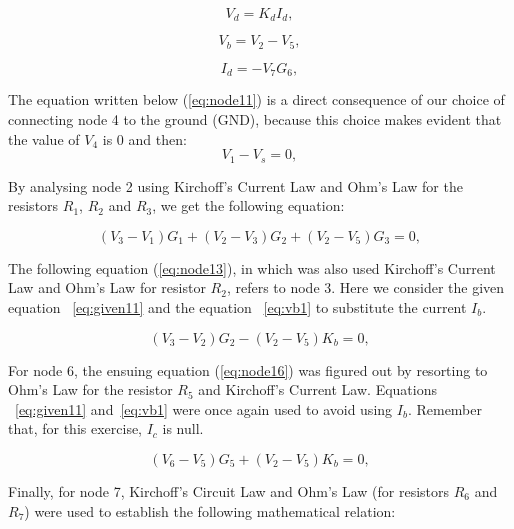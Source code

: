 \begin{equation}
  V_{d} = K_{d}I_{d} ,
  \label{eq:given12}
\end{equation}

\begin{equation}
  V_{b} = V_{2} - V_{5} ,
  \label{eq:vb1}
\end{equation}

\begin{equation}
  I_{d} = -V_{7}G_{6} ,
  \label{eq:id1}
\end{equation}

The equation written below (\ref{eq:node11}) is a direct consequence of our choice of connecting node 4 to the ground (GND), because this choice makes evident that the value of $V_4$ is 0 and then:
\begin{equation}
  V_{1} - V_{s} = 0,
  \label{eq:node11}
\end{equation}

By analysing node 2 using Kirchoff's Current Law and Ohm's Law for the resistors $R_1$, $R_2$ and $R_3$, we get the following equation:

\begin{equation}
  (V_{3} - V_{1})G_{1} + (V_{2} - V_{3})G_{2} + (V_{2} - V_{5})G_{3}= 0,
  \label{eq:node12}
\end{equation}

The following equation (\ref{eq:node13}), in which was also used Kirchoff's Current Law and Ohm's Law for resistor $R_2$, refers to node 3. Here we consider the given equation ~\ref{eq:given11} and the equation ~\ref{eq:vb1} to substitute the current $I_b$.

\begin{equation}
  (V_{3} - V_{2})G_{2} - (V_{2} - V_{5})K_{b} = 0,
  \label{eq:node13}
\end{equation}

For node 6, the ensuing equation (\ref{eq:node16}) was figured out by resorting to Ohm's Law for the resistor $R_5$ and Kirchoff's Current Law. Equations ~\ref{eq:given11} and~\ref{eq:vb1} were once again used to avoid using $I_b$. Remember that, for this exercise, $I_c$ is null.

\begin{equation}
  (V_{6} - V_{5})G_{5} + (V_{2} - V_{5})K_{b} = 0,
  \label{eq:node16}
\end{equation}

Finally, for node 7, Kirchoff's Circuit Law and Ohm's Law (for resistors $R_6$ and $R_7$) were used to establish the following mathematical relation:

